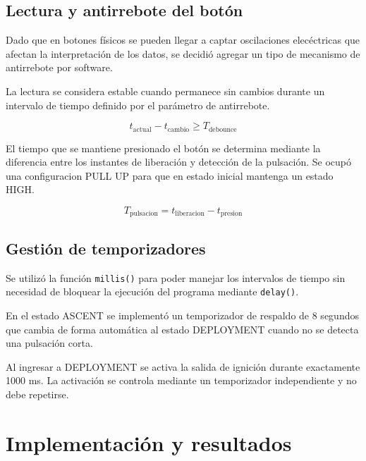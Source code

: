 \documentclass[10pt,a4paper]{article}
\begin{document}
\subsection{Lectura y antirrebote del botón}

Dado que en botones físicos se pueden llegar a 
captar oscilaciones elecéctricas que afectan la interpretación
de los datos, se decidió agregar un tipo de mecanismo de
antirrebote por software.

La lectura se considera estable cuando permanece sin
cambios durante un intervalo de tiempo definido por
el parámetro de antirrebote.

\begin{equation}
t_{\mathrm{actual}}-t_{\mathrm{cambio}}
\geq T_{\mathrm{debounce}}
\label{eq:debounce}
\end{equation}

El tiempo que se mantiene presionado el botón 
se determina mediante la diferencia entre los instantes
de liberación y detección de la pulsación. Se ocupó una 
configuracion PULL UP para que en estado inicial mantenga un
estado HIGH. 

\begin{equation}
T_{\mathrm{pulsacion}} =
t_{\mathrm{liberacion}}-t_{\mathrm{presion}}
\label{eq:pulsacion}
\end{equation}

\subsection{Gestión de temporizadores}

Se utilizó la función \texttt{millis()} para poder manejar
los intervalos de tiempo sin necesidad de bloquear la ejecución
del programa mediante \texttt{delay()}.

En el estado ASCENT se implementó un temporizador
de respaldo de 8 segundos que cambia de forma automática al
estado DEPLOYMENT cuando no se detecta una pulsación corta.

Al ingresar a DEPLOYMENT se activa la salida de
ignición durante exactamente 1000 ms. La activación
se controla mediante un temporizador independiente
y no debe repetirse.


\newpage

\section{Implementación y resultados}
\end{document}
